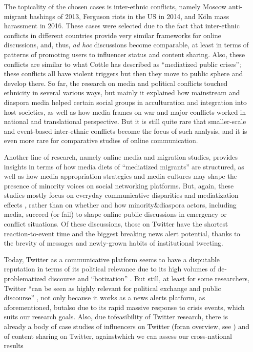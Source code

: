 The topicality of the chosen cases is inter-ethnic conflicts, namely Moscow anti-migrant bashings of 2013, Ferguson riots in the US in 2014, and Köln mass harassment in 2016. These cases were selected due to the fact that inter-ethnic conflicts in different countries provide very similar frameworks for online discussions, and, thus, \textit{ad hoc} discussions become comparable, at least in terms of patterns of promoting users to influencer status and content sharing. Also, these conflicts are similar to what Cottle \cite{Cottle2006} has described as “mediatized public crises”; these conflicts all have violent triggers but then they move to public sphere and develop there. So far, the research on media and political conflicts \cite{Cottle,Cottle2006,Horsti,EskjaerHjarvardMortensen} touched ethnicity in several various ways, but mainly it explained how mainstream and diaspora media helped certain social groups in acculturation and integration into host societies, as well as how media frames on war and major conflicts worked in national and translational perspective. But it is still quite rare that smaller-scale and event-based inter-ethnic conflicts become the focus of such analysis, and it is even more rare for comparative studies of online communication.

Another line of research, namely online media and migration studies, provides insights in terms of how media diets of “mediatized migrants” \cite[p.~1]{HeppBozdagSuna} are structured, as well as how media appropriation strategies and media cultures \cite{BaileyGeorgiouHarindranath} may shape the presence of minority voices on social networking platforms. But, again, these studies mostly focus on everyday communicative disparities and mediatization effects \cite{Bozdag}, rather than on whether and how minority\&diaspora actors, including media, succeed (or fail) to shape online public discussions in emergency or conflict situations. Of these discussions, those on Twitter have the shortest reaction-to-event time and the biggest breaking news alert potential, thanks to the brevity of messages and newly-grown habits of institutional tweeting.

Today, Twitter as a communicative platform seems to have a disputable reputation in terms of its political relevance \cite{Fuchs} due to its high volumes of de-problematized discourse and “botization” \cite{SanovichStukalPenfoldBrown}. But still, at least for some researchers, Twitter “can be seen as highly relevant for political exchange and public discourse” \cite[p.~254]{ThimmDangAnhEinspanner}, not only because it works as a news alerts platform, as aforementioned, butalso due to its rapid massive response to crisis events, which suits our research goals. Also, due tofeasibility of Twitter research, there is already a body of case studies of influencers on Twitter (foran overview, see \cite{BodrunovaBlekanovMaksimov}) and of content sharing on Twitter, againstwhich we can assess our cross-national results

